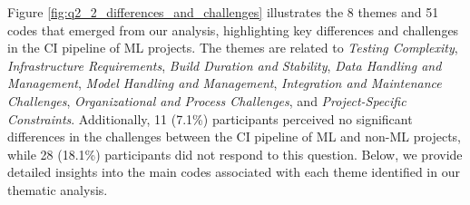 
Figure \ref{fig:q2_2_differences_and_challenges} illustrates the 8 themes and 51 codes that emerged from our analysis, highlighting key differences and challenges in the CI pipeline of ML projects. The themes are related to
\textit{Testing Complexity},
\textit{Infrastructure Requirements},
\textit{Build Duration and Stability},
\textit{Data Handling and Management},
\textit{Model Handling and Management},
\textit{Integration and Maintenance Challenges},
\textit{Organizational and Process Challenges}, and
\textit{Project-Specific Constraints}.
Additionally, 11 (7.1\%) participants perceived no significant differences in the challenges between the CI pipeline of ML and non-ML projects, while 28 (18.1\%) participants did not respond to this question. 
Below, we provide detailed insights into the main codes associated with each theme identified in our thematic analysis.

